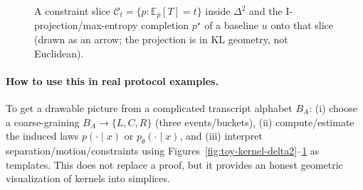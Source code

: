 \documentclass[11pt,a4paper]{article}
\theoremstyle{definition}
\theoremstyle{plain}
\begin{document}
\begin{figure}[ht]
\centering
{}
\caption{A constraint slice $\mathcal{C}_t=\{p:\mathbb{E}_p[T]=t\}$ inside $\Delta^2$ and the I-projection/max-entropy completion $p^\star$ of a baseline $u$ onto that slice (drawn as an arrow; the projection is in KL geometry, not Euclidean).}
\label{fig:toy-i-projection}
\end{figure}

\paragraph{How to use this in real protocol examples.}
To get a drawable picture from a complicated transcript alphabet $B_A$:
(i) choose a coarse-graining $B_A\to\{L,C,R\}$ (three events/buckets),
(ii) compute/estimate the induced laws $p(\cdot\mid x)$ or $p_{\theta}(\cdot\mid x)$,
and (iii) interpret separation/motion/constraints using Figures~\ref{fig:toy-kernel-delta2}--\ref{fig:toy-i-projection} as templates.
This does not replace a proof, but it provides an honest geometric visualization of kernels into simplices.



\end{document}
